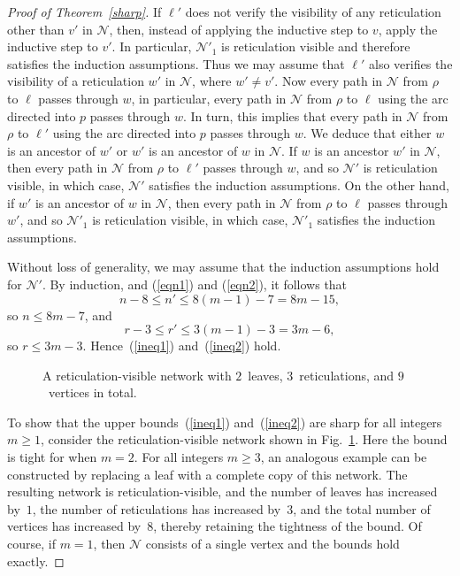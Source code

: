 \documentclass[11pt]{amsart}
\begin{document}
\begin{proof}[Proof of Theorem~\ref{sharp}]
If $\ell'$ does not verify the visibility of any reticulation other than $v'$ in ${{\mathcal N}}$, then, instead of applying the inductive step to $v$, apply the inductive step to $v'$. In particular, ${{\mathcal N}}'_1$ is reticulation visible and therefore satisfies the induction assumptions. Thus we may assume that $\ell'$ also verifies the visibility of a reticulation $w'$ in ${{\mathcal N}}$, where $w'\neq v'$. Now every path in ${{\mathcal N}}$ from $\rho$ to $\ell$ passes through $w$, in particular, every path in ${{\mathcal N}}$ from $\rho$ to $\ell$ using the arc directed into $p$ passes through $w$. In turn, this implies that every path in ${{\mathcal N}}$ from $\rho$ to $\ell'$ using the arc directed into $p$ passes through $w$. We deduce that either $w$ is an ancestor of $w'$ or $w'$ is an ancestor of $w$ in ${{\mathcal N}}$. If $w$ is an ancestor $w'$ in ${{\mathcal N}}$, then every path in ${{\mathcal N}}$ from $\rho$ to $\ell'$ passes through $w$, and so ${{\mathcal N}}'$ is reticulation visible, in which case, ${{\mathcal N}}'$ satisfies the induction assumptions. On the other hand, if $w'$ is an ancestor of $w$ in ${{\mathcal N}}$, then every path in ${{\mathcal N}}$ from $\rho$ to $\ell$ passes through $w'$, and so ${{\mathcal N}}'_1$ is reticulation visible, in which case, ${{\mathcal N}}'_1$ satisfies the induction assumptions.

Without loss of generality, we may assume that the induction assumptions hold for ${{\mathcal N}}'$. By induction, and (\ref{eqn1}) and (\ref{eqn2}), it follows that
$$n-8\le n'\le 8(m-1)-7=8m-15,$$
so $n\le 8m-7$, and
$$r-3\le r'\le 3(m-1)-3=3m-6,$$
so $r\le 3m-3$. Hence~(\ref{ineq1}) and~(\ref{ineq2}) hold.

\begin{figure}
\center

\caption{A reticulation-visible network with $2$~leaves, $3$~reticulations, and $9$~vertices in total.}
\label{2sharp}
\end{figure}

To show that the upper bounds~(\ref{ineq1}) and~(\ref{ineq2}) are sharp for all integers $m\ge 1$, consider the reticulation-visible network shown in Fig.~\ref{2sharp}. Here the bound is tight for when $m=2$.
For all integers $m\ge 3$, an analogous example can be constructed by replacing a leaf with a complete copy of this network. The resulting network is reticulation-visible, and the number of leaves has increased by~$1$, the number of reticulations has increased by~$3$, and the total number of vertices has increased by~$8$, thereby retaining the tightness of the bound. Of course, if $m=1$, then ${{\mathcal N}}$ consists of a single vertex and the bounds hold exactly.

\end{proof}
\end{document}
